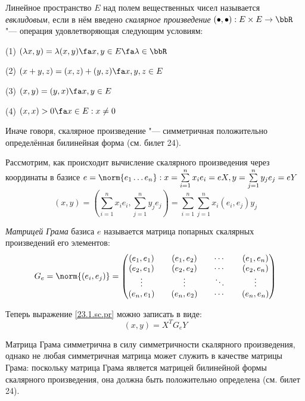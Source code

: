 \begin{defn}
Линейное пространство $E$ над полем вещественных чисел называется \textit{евклидовым}, если в нём введено \textit{скалярное произведение} $(\bullet,\bullet): E\times E \rightarrow \bbR$ "--- операция удовлетворяющая следующим условиям:

(1) $(\lambda x,y)=\lambda(x,y) \fa x,y \in E \fa \lambda \in \bbR$

(2) $(x+y,z)=(x,z)+(y,z) \fa x,y,z \in E$

(3) $(x,y)=(y,x) \fa x,y \in E$

(4) $(x,x)>0 \fa x \in E: x \neq 0$
\end{defn}
  \begin{notion}
  Иначе говоря, скалярное произведение "--- симметричная положительно определённая билинейная форма (см. билет 24).
  \end{notion}
  Рассмотрим, как происходит вычисление скалярного произведения через координаты в базисе $e=\norm{e_1 \ldots e_n}:x=\sum\limits_{i=1}^nx_ie_i=eX, y=\sum\limits_{j=1}^ny_je_j=eY$
  \begin{equation}\label{23.1.sc.pr}
  (x,y)=(\sum\limits_{i=1}^nx_ie_i,\sum\limits_{j=1}^ny_je_j)=\sum\limits_{i=1}^n\sum\limits_{j=1}^nx_i(e_i,e_j)y_j
  \end{equation}
  \begin{defn}
  \textit{Матрицей Грама} базиса $e$ называется матрица попарных скалярных произведений его элементов:
  \begin{equation}
  G_e=\norm{(e_i,e_j)}=\begin{pmatrix}
  (e_1,e_1)&&(e_1,e_2)&&\cdots&&(e_1,e_n)\\
  (e_2,e_1)&&(e_2,e_2)&&\cdots&&(e_2,e_n)\\
  \vdots   && \vdots  &&\ddots&& \vdots  \\
  (e_n,e_1)&&(e_n,e_2)&&\cdots&&(e_n,e_n)\\
  \end{pmatrix}
  \end{equation}
  \end{defn}
  Теперь выражение \ref{23.1.sc.pr} можно записать в виде:
  \begin{equation}
  (x,y)=X^TG_eY
  \end{equation}
  \begin{notion}
  Матрица Грама симметрична в силу симметричности скалярного произведения, однако не любая симметричная матрица может служить в качестве матрицы Грама: поскольку матрица Грама является матрицей билинейной формы скалярного произведения, она должна быть положительно определена (см. билет 24).
  \end{notion}
  
